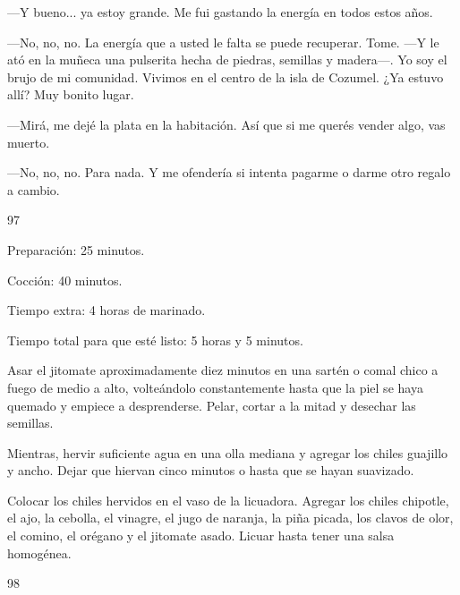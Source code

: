 \documentclass[12pt,twoside,openright,a5paper]{book}
\begin{document}
---Y bueno... ya estoy grande. Me fui gastando la energía en todos estos años.

---No, no, no. La energía que a usted le falta se puede recuperar. Tome. 
---Y le ató en la muñeca una pulserita hecha de piedras, semillas y madera---.
Yo soy el brujo de mi comunidad. Vivimos en el centro de la isla de
Cozumel. ¿Ya estuvo allí? Muy bonito lugar.

---Mirá, me dejé la plata en la habitación. Así que si me querés vender
algo, vas muerto.

---No, no, no. Para nada. Y me ofendería si intenta pagarme o darme otro
regalo a cambio.

\vspace{0.5cm}

\hrulefill \hspace{0.1cm}\decofourleft\hspace{0.2cm} 97 \hspace{0.2cm}\decofourright \hspace{0.1cm}\hrulefill

\nopagebreak

\vspace{0.5cm}

\nopagebreak

Preparación: 25 minutos.

Cocción: 40 minutos.

Tiempo extra: 4 horas de marinado.

Tiempo total para que esté listo: 5 horas y 5 minutos.

Asar el jitomate aproximadamente diez minutos en una sartén o comal chico a 
fuego de medio a alto, volteándolo
constantemente hasta que la piel se haya quemado y empiece a desprenderse.
Pelar, cortar a la mitad y desechar las semillas.

Mientras, hervir suficiente agua en una olla mediana y agregar los
chiles guajillo y ancho. Dejar que hiervan cinco minutos o hasta que se hayan suavizado.

Colocar los chiles hervidos en el vaso de la licuadora. Agregar los
chiles chipotle, el ajo, la cebolla, el vinagre, el jugo de naranja, la piña picada,
los clavos de olor, el comino, el orégano y el jitomate asado. Licuar hasta tener una
salsa homogénea.


\vspace{0.5cm}

\hrulefill \hspace{0.1cm}\decofourleft\hspace{0.2cm} 98 \hspace{0.2cm}\decofourright \hspace{0.1cm}\hrulefill
\end{document}
